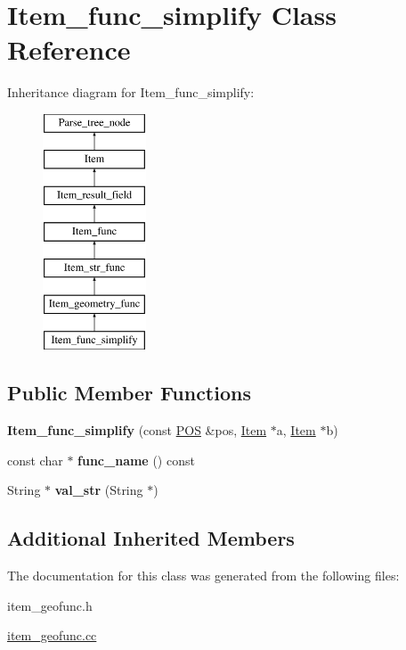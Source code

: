 \hypertarget{classItem__func__simplify}{}\section{Item\+\_\+func\+\_\+simplify Class Reference}
\label{classItem__func__simplify}
Inheritance diagram for Item\+\_\+func\+\_\+simplify\+:\begin{figure}[H]
\begin{center}
\leavevmode
\includegraphics[height=7.000000cm]{classItem__func__simplify}
\end{center}
\end{figure}
\subsection*{Public Member Functions}
\begin{DoxyCompactItemize}
\item 
\mbox{\label{classItem__func__simplify_a5c14dd5ce127088e75b7823dd3ea5b58}} 
{\bfseries Item\+\_\+func\+\_\+simplify} (const \mbox{\hyperlink{structYYLTYPE}{P\+OS}} \&pos, \mbox{\hyperlink{classItem}{Item}} $\ast$a, \mbox{\hyperlink{classItem}{Item}} $\ast$b)
\item 
\mbox{\label{classItem__func__simplify_acc7b74a7773851ecec256daed2044b35}} 
const char $\ast$ {\bfseries func\+\_\+name} () const
\item 
\mbox{\label{classItem__func__simplify_ad629c07daeb0f3bb758dc92ae067a030}} 
String $\ast$ {\bfseries val\+\_\+str} (String $\ast$)
\end{DoxyCompactItemize}
\subsection*{Additional Inherited Members}


The documentation for this class was generated from the following files\+:\begin{DoxyCompactItemize}
\item 
item\+\_\+geofunc.\+h\item 
\mbox{\hyperlink{item__geofunc_8cc}{item\+\_\+geofunc.\+cc}}\end{DoxyCompactItemize}
